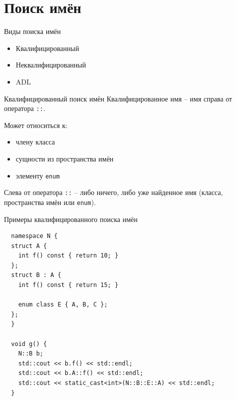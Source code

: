 \documentclass[unknownkeysallowed,xcolor=table]{beamer}
\begin{document}
\section{Поиск имён}

\begin{frame}{Виды поиска имён}
  \begin{itemize}
    \item Квалифицированный \vspace{2em}
    \item Неквалифицированный \vspace{2em}
    \item ADL
  \end{itemize}
\end{frame}

\begin{frame}{Квалифицированный поиск имён}
  Квалифицированное имя -- имя справа от оператора \lstinline{::}.

  \vspace{1em}

  Может относиться к:

  \vspace{0.5em}

  \begin{itemize}
    \item члену класса \vspace{0.5em}
    \item сущности из пространства имён \vspace{0.5em}
    \item элементу \lstinline{enum}
  \end{itemize}

  \vspace{1em}

  Слева от оператора \lstinline{::} -- либо ничего, либо уже найденное имя (класса, пространства имён или \lstinline{enum}).
\end{frame}

\begin{frame}[fragile]{Примеры квалифицированного поиска имён}
  \begin{lstlisting}
  namespace N {   
  struct A {
    int f() const { return 10; }
  };
  struct B : A {
    int f() const { return 15; }

    enum class E { A, B, C };
  };
  }

  void g() {
    N::B b;
    std::cout << b.f() << std::endl;
    std::cout << b.A::f() << std::endl;
    std::cout << static_cast<int>(N::B::E::A) << std::endl;
  }
  \end{lstlisting}
\end{frame}
\end{document}
